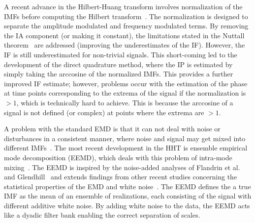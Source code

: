 \documentclass[a4paper]{IEEEtran}
\begin{document}
A recent advance in the Hilbert-Huang transform involves normalization of the IMFs before computing the Hilbert transform~\cite{Huang2005}. The normalization is designed to separate the amplitude modulated and frequency modulated terms. By removing the IA component (or making it constant), the limitations stated in the Nuttall theorem~\cite{Nuttall1966} are addressed (improving the underestimates of the IF). However, the IF is still underestimated for non-trivial signals. This short-coming led to the development of the direct quadrature method, where the IP is estimated by simply taking the arccosine of the normalized IMFs. This provides a further improved IF estimate; however, problems occur with the estimation of the phase at time points corresponding to the extrema of the signal if the normalization is $>1$, which is technically hard to achieve. This is because the arccosine of a signal is not defined (or complex) at points where the extrema are $>1$. 

A problem with the standard EMD is that it can not deal with noise or disturbances in a consistent manner, where noise and signal may get mixed into different IMFs~\cite{Wu2009}. The most recent development in the HHT is ensemble empirical mode decomposition (EEMD), which deals with this problem of intra-mode mixing~\cite{Wu2009}. The EEMD is inspired by the noise-added analyses of Flandrin et al.~\cite{Flandrin2005} and Glendhill~\cite{Gledhill2003} and extends findings from other recent studies concerning the statistical properties of the EMD and white noise~\cite{Flandrin2004,Wu2004}. The EEMD defines the a true IMF as the mean of an ensemble of realizations, each consisting of the signal with different additive white noise. By adding white noise to the data, the EEMD acts like a dyadic filter bank enabling the correct separation of scales.
\end{document}
